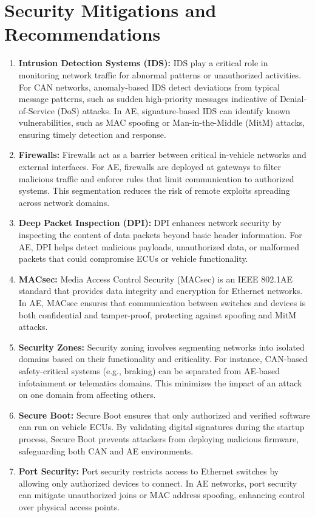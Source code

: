 \documentclass{report}
\begin{document}
\section{Security Mitigations and Recommendations}
\begin{enumerate}
    \item \textbf{Intrusion Detection Systems (IDS):}
    IDS play a critical role in monitoring network traffic for abnormal patterns or unauthorized activities.\cite{rathore2022invehicle} For CAN networks, anomaly-based IDS detect deviations from typical message patterns, such as sudden high-priority messages indicative of Denial-of-Service (DoS) attacks. In AE, signature-based IDS can identify known vulnerabilities, such as MAC spoofing or Man-in-the-Middle (MitM) attacks, ensuring timely detection and response. \cite{Evaluationframe}

    \item \textbf{Firewalls:}
    Firewalls act as a barrier between critical in-vehicle networks and external interfaces. For AE, firewalls are deployed at gateways to filter malicious traffic and enforce rules that limit communication to authorized systems. This segmentation reduces the risk of remote exploits spreading across network domains.

    \item \textbf{Deep Packet Inspection (DPI):}
    DPI enhances network security by inspecting the content of data packets beyond basic header information. For AE, DPI helps detect malicious payloads, unauthorized data, or malformed packets that could compromise ECUs or vehicle functionality.

    \item \textbf{MACsec:}
    Media Access Control Security (MACsec) is an IEEE 802.1AE standard that provides data integrity and encryption for Ethernet networks. In AE, MACsec ensures that communication between switches and devices is both confidential and tamper-proof, protecting against spoofing and MitM attacks.

    \item \textbf{Security Zones:}
    Security zoning involves segmenting networks into isolated domains based on their functionality and criticality. For instance, CAN-based safety-critical systems (e.g., braking) can be separated from AE-based infotainment or telematics domains. This minimizes the impact of an attack on one domain from affecting others.

    \item \textbf{Secure Boot:}
    Secure Boot ensures that only authorized and verified software can run on vehicle ECUs. By validating digital signatures during the startup process, Secure Boot prevents attackers from deploying malicious firmware, safeguarding both CAN and AE environments.

    \item \textbf{Port Security:}
    Port security restricts access to Ethernet switches by allowing only authorized devices to connect. In AE networks, port security can mitigate unauthorized joins or MAC address spoofing, enhancing control over physical access points.

\end{enumerate}
\end{document}
